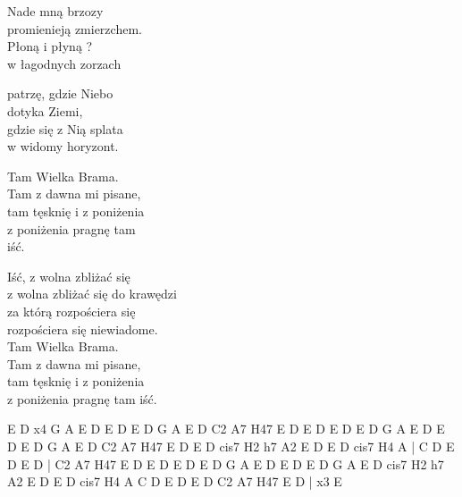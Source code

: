 \begin{textn}
    \ifchorded{\hfill\break}
    Nade mną brzozy\\
    promienieją zmierzchem.\\
    Płoną i płyną ?\\
    w łagodnych zorzach

    patrzę, gdzie Niebo\\
    dotyka Ziemi,\\
    gdzie się z Nią splata\\
    w widomy horyzont.

    Tam Wielka Brama.\\
    Tam z dawna mi pisane,\\
    tam tęsknię i z poniżenia\\
    z poniżenia pragnę tam\\
    iść.

    Iść, z wolna zbliżać się\\
    z wolna zbliżać się do krawędzi\\
    za którą rozpościera się\\
    rozpościera się niewiadome.\\
    Tam Wielka Brama.\\
    Tam z dawna mi pisane,\\
    tam tęsknię i z poniżenia\\
    z poniżenia pragnę tam
    iść.
\end{textn}
\begin{chordw}
    E D x4
    G A E D
    E D E D
    G A E D
    C2 A7 H47 E D E D
    E D E D
    G A E D
    E D E D
    G A E D
    C2 A7 H47 E D E D
    cis7 H2
    h7 A2 E D E D
    cis7 H4 A | C D
    E D E D	|
    C2 A7 H47 E D E D
    E D E D
    G A E D
    E D E D
    G A E D
    cis7 H2
    h7 A2 E D E D
    cis7 H4 A
    C D
    E D E D
    C2 A7 H47 E D | x3
    E
\end{chordw}